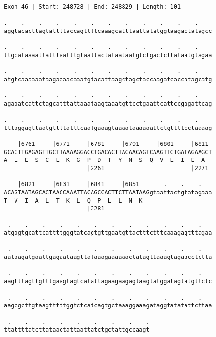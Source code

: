 \documentclass{article}
\begin{document}
\newpage
\begin{Verbatim}[fontfamily=courier]
Exon 46 | Start: 248728 | End: 248829 | Length: 101

.    .    .    .    .    .    .    .    .    .    .    .    
aggtacacttagtattttaccagttttcaaagcatttaattatatggtaagactatagcc

.    .    .    .    .    .    .    .    .    .    .    .    
ttgcataaaattatttaatttgtaattactataataatgtctgactcttataatgtagaa

.    .    .    .    .    .    .    .    .    .    .    .    
atgtcaaaaaataagaaaacaaatgtacattaagctagctaccaagatcaccatagcatg

.    .    .    .    .    .    .    .    .    .    .    .    
agaaatcattctagcatttattaaataagtaaatgttcctgaattcattccgagattcag

.    .    .    .    .    .    .    .    .    .    .    .    
tttaggagttaatgttttatttcaatgaaagtaaaataaaaaattctgttttcctaaaag

    |6761     |6771     |6781     |6791     |6801     |6811 
GCACTTGAGAGTTGCTTAAAAGGACCTGACACTTACAACAGTCAAGTTCTGATAGAAGCT
A  L  E  S  C  L  K  G  P  D  T  Y  N  S  Q  V  L  I  E  A  
                        |2261                         |2271 

    |6821     |6831     |6841     |6851       .    .    .   
ACAGTAATAGCACTAACCAAATTACAGCCACTTCTTAATAAGgtaattactgtatagaaa
T  V  I  A  L  T  K  L  Q  P  L  L  N  K                    
                        |2281                               

 .    .    .    .    .    .    .    .    .    .    .    .   
atgagtgcattcattttgggtatcagtgttgaatgttactttctttcaaagagtttagaa

 .    .    .    .    .    .    .    .    .    .    .    .   
aataagatgaattgagaataagttataaagaaaaaactatagttaaagtagaacctctta

 .    .    .    .    .    .    .    .    .    .    .    .   
aagtttagttgtttgaagtagtcatattagaagaagagtaagtatggatagtatgttctc

 .    .    .    .    .    .    .    .    .    .    .    .   
aagcgcttgtaagtttttggtctcatcagtgctaaaggaaagataggtatatattcttaa

 .    .    .    .    .    .    .    .    .
ttattttatcttataactattaattatctgctattgccaagt
\end{Verbatim}
\newpage
\end{document}
